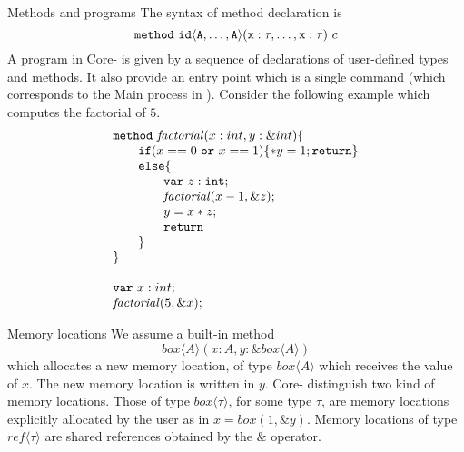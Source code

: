 \documentclass[12pt]{article}
\def\sail{{\sc{sail}}}
\begin{document}
\begin{paragraph}{Methods and programs}
The syntax of method declaration is 
$$
{\tt{method~id\langle A,\ldots,A \rangle(x:\tau,\ldots,x:\tau)}}~c
$$
A program in Core-\sail{} is given by a sequence of declarations of user-defined types and methods. It also provide an entry 
point which is a single command (which corresponds to the Main process in \sail{}). Consider the following example which computes 
the factorial of $5$.
$$
\begin{array}{l}
{\tt{method}}~{\mathit{factorial}}(x : int, y:\&int) \{\\
    \qquad {\tt{if}} (x==0~{\tt{or}}~x==1 ) \{*y = 1; {\tt{return}}\}\\
    \qquad{\tt{else}} \{\\
    \qquad\qquad  {\tt{var}}~z : {\tt{int}};\\
    \qquad\qquad  {\mathit{factorial}}(x - 1, \&z);\\
    \qquad\qquad  y = x * z;\\
    \qquad\qquad  {\tt{return}}\\
    \qquad\}\\
\}
\\\\

{\tt{var}}~x : int;\\
{\mathit{factorial}} (5, \&x);\\

\end{array}
$$
\end{paragraph}

\begin{paragraph}{Memory locations}
We assume a built-in method 
$$box\langle A\rangle (x:A, y:\&box\langle A\rangle)$$
 which allocates a new memory location, of type $box\langle A\rangle$ 
which receives the value of $x$. The new memory location is written in $y$. Core-\sail{} distinguish two kind of 
memory locations. Those of type $box\langle\tau\rangle$, for some type $\tau$, are memory locations explicitly allocated 
by the user as in $x = box(1,\&y)$. Memory locations of type $ref\langle\tau\rangle$ are shared references obtained by 
the $\&$ operator.
\end{paragraph}
\end{document}
